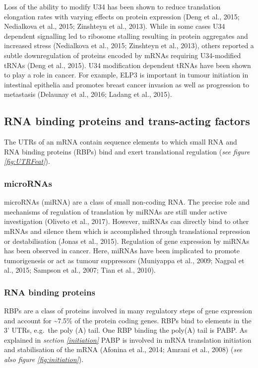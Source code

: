 \documentclass[
  12pt,
  openany]{book}
\begin{document}
Loss of the ability to modify U34 has been shown to reduce translation elongation rates with varying effects on protein expression (Deng et al., 2015; Nedialkova et al., 2015; Zinshteyn et al., 2013). While in some cases U34 dependent signalling led to ribosome stalling resulting in protein aggregates and increased stress (Nedialkova et al., 2015; Zinshteyn et al., 2013), others reported a subtle downregulation of proteins encoded by mRNAs requiring U34-modified tRNAs (Deng et al., 2015). U34 modification dependent tRNAs have been shown to play a role in cancer. For example, ELP3 is important in tumour initiation in intestinal epithelia and promotes breast cancer invasion as well as progression to metastasis (Delaunay et al., 2016; Ladang et al., 2015).

\subsection{RNA binding proteins and trans-acting factors}

The UTRs of an mRNA contain sequence elements to which small RNA and RNA binding proteins (RBPs) bind and exert translational regulation (\emph{see figure \ref{fig:UTRFeat}}).

\subsubsection{microRNAs}

microRNAs (miRNA) are a class of small non-coding RNA. The precise role and mechanisms of regulation of translation by miRNAs are still under active investigation (Oliveto et al., 2017). However, miRNAs can directly bind to other mRNAs and silence them which is accomplished through translational repression or destabilisation (Jonas et al., 2015). Regulation of gene expression by miRNAs has been observed in cancer. Here, miRNAs have been implicated to promote tumorigenesis or act as tumour suppressors (Muniyappa et al., 2009; Nagpal et al., 2015; Sampson et al., 2007; Tian et al., 2010).

\subsubsection{RNA binding proteins}

RBPs are a class of proteins involved in many regulatory steps of gene expression and account for \textasciitilde7.5\% of the protein coding genes. RBPs bind to elements in the 3' UTRs, e.g.~the poly (A) tail. One RBP binding the poly(A) tail is PABP. As explained in \emph{section \ref{initiation}} PABP is involved in mRNA translation initiation and stabilisation of the mRNA (Afonina et al., 2014; Amrani et al., 2008) (\emph{see also figure \ref{fig:initiation}}).
\end{document}
